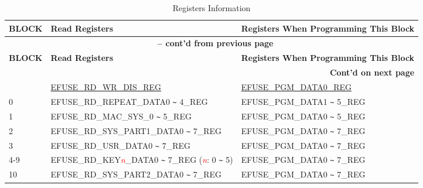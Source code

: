 \begin{longtable}[c]{|l|l|l|}
\caption{Registers Information}
\label{tab:efuse-softw-read-para}
\\\hline
    \rowcolor{lightgray}
        \textbf{BLOCK} & \textbf{Read Registers} & \textbf{Registers When Programming This Block}\\
    \endfirsthead
    
    \multicolumn{3}{c}{\bfseries \tablename\ \thetable{} -- cont'd from previous page}\\\hline
    
    \rowcolor{lightgray}
        \textbf{BLOCK} & \textbf{Read Registers} & \textbf{Registers When Programming This Block}\\
    \endhead
    
    \multicolumn{3}{r}{\textbf{Cont'd on next page}} \\
    \endfoot
    \endlastfoot
    \hline
0  & \hyperref[regdesc:EFUSERDWRDISREG]{EFUSE\_RD\_WR\_DIS\_REG} & \hyperref[regdesc:EFUSEPGMDATANREG]{EFUSE\_PGM\_DATA0\_REG} \\\hline
0  & EFUSE\_RD\_REPEAT\_DATA0 \verb+~+ 4\_REG & EFUSE\_PGM\_DATA1 \verb+~+ 5\_REG \\\hline
1  & EFUSE\_RD\_MAC\_SYS\_0 \verb+~+ 5\_REG & EFUSE\_PGM\_DATA0 \verb+~+ 5\_REG \\\hline
2  & EFUSE\_RD\_SYS\_PART1\_DATA0 \verb+~+ 7\_REG & EFUSE\_PGM\_DATA0 \verb+~+ 7\_REG \\\hline
3  & EFUSE\_RD\_USR\_DATA0 \verb+~+ 7\_REG & EFUSE\_PGM\_DATA0 \verb+~+ 7\_REG \\ \hline
4-9 & EFUSE\_RD\_KEY\textcolor{red}{\it{n}}\_DATA0 \verb+~+ 7\_REG (\textcolor{red}{\it{n}}: 0 \verb+~+ 5) & EFUSE\_PGM\_DATA0 \verb+~+ 7\_REG \\\hline
10 & EFUSE\_RD\_SYS\_PART2\_DATA0 \verb+~+ 7\_REG & EFUSE\_PGM\_DATA0 \verb+~+ 7\_REG \\\hline
\end{longtable}
